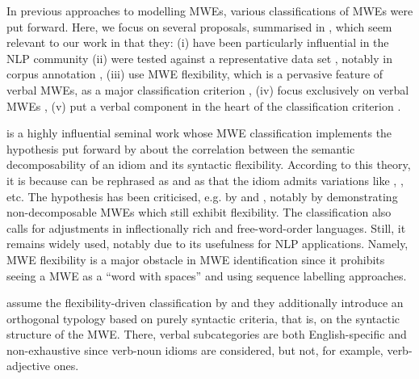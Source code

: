 \documentclass[output=paper,modfonts]{langscibook}
\begin{document}
In previous approaches to modelling MWEs, various classifications of MWEs were put forward. 
Here, we focus on several proposals, summarised in , which seem relevant to our work in that they: 
(i) have been particularly influential in the NLP community \citep{Sag2002a,baldwin2010multiword,Melcuk10}
(ii) were tested against a representative data set \citep{Melcuk10}, notably in corpus annotation \citep{schneider2014}, %
(iii) use MWE flexibility, which is a pervasive feature of verbal MWEs, as a major classification criterion \citep{Sag2002a}, 
(iv) focus exclusively on verbal MWEs \citep{Sheinfux17}, 
(v) put a verbal component in the heart of the classification criterion \citep{Laporte:forth}.


\citet{Sag2002a} is a highly influential seminal work whose MWE classification implements the hypothesis put forward by \citet{nunberg-94} about the correlation between the semantic decomposability of an idiom and its syntactic flexibility. According to this theory, it is because  can be rephrased as  and  as  that the idiom  admits variations like , , etc. The hypothesis has been criticised, e.g. by \citet{Sheinfux17} and \citet{Laporte:forth}, notably by demonstrating non-decomposable MWEs which still exhibit flexibility. The \citet{Sag2002a} classification also calls for adjustments in inflectionally rich and free-word-order languages. Still, it remains widely used, notably due to its usefulness for NLP applications. Namely, MWE flexibility is a major obstacle in MWE identification since it prohibits seeing a MWE as a ``word with spaces'' and using sequence labelling approaches.

\citet{baldwin2010multiword} assume the flexibility-driven classification by \citet{Sag2002a} and they additionally introduce an orthogonal typology based on purely syntactic criteria, that is, on the syntactic structure of the MWE. There, verbal subcategories are both English-specific and non-exhaustive since verb-noun idioms are considered, but not, for example, verb-adjective ones.
\end{document}
